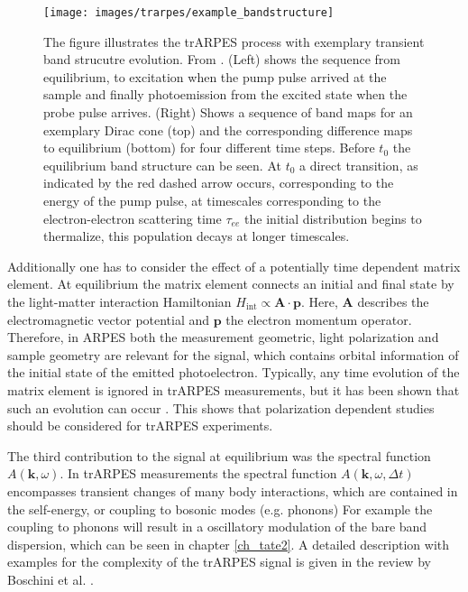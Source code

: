 \begin{figure}
	\centering
	\texttt{[image: images/trarpes/example\_bandstructure]}
	\caption{The figure illustrates the trARPES process with exemplary transient band strucutre evolution. From \cite{boschini_time-resolved_2024}. (Left) shows the sequence from equilibrium, to excitation when the pump pulse arrived at the sample and finally photoemission from the excited state when the probe pulse arrives. (Right) Shows a sequence of band maps for an exemplary Dirac cone (top) and the corresponding difference maps to equilibrium (bottom) for four different time steps. Before $t_0$ the equilibrium band structure can be seen. At $t_0$ a direct transition, as indicated by the red dashed arrow occurs, corresponding to the energy of the pump pulse, at timescales corresponding to the electron-electron scattering time $\tau_{ee}$ the initial distribution begins to thermalize, this population decays at longer timescales.}
	\label{fig:example_bandstructure}
\end{figure}


Additionally one has to consider the effect of a potentially time dependent matrix element.
At equilibrium the matrix element connects an initial and final state by the light-matter interaction Hamiltonian $H_\text{int} \propto \mathbf{A\cdot\mathbf{p}}$.
Here, $\mathbf{A}$ describes the electromagnetic vector potential and $\mathbf{p}$ the electron momentum operator.
Therefore, in ARPES both the measurement geometric, light polarization and sample geometry are relevant for the signal, which contains orbital information of the initial state of the emitted photoelectron.
Typically, any time evolution of the matrix element is ignored in trARPES measurements, but it has been shown that such an evolution can occur \cite{boschini_role_2020,freericks_constant_2016}.
This shows that polarization dependent studies should be considered for trARPES experiments.

The third contribution to the signal at equilibrium was the spectral function $A(\mathbf{k}, \omega)$.
In trARPES measurements the spectral function $A(\mathbf{k}, \omega, \Delta t)$ encompasses transient changes of many body interactions, which are contained in the self-energy, or coupling to bosonic modes (e.g. phonons)
For example the coupling to phonons will result in a oscillatory modulation of the bare band dispersion, which can be seen in chapter \ref{ch_tate2}.
A detailed description with examples for the complexity of the trARPES signal is given in the review by Boschini et al. \cite{boschini_time-resolved_2024}.


